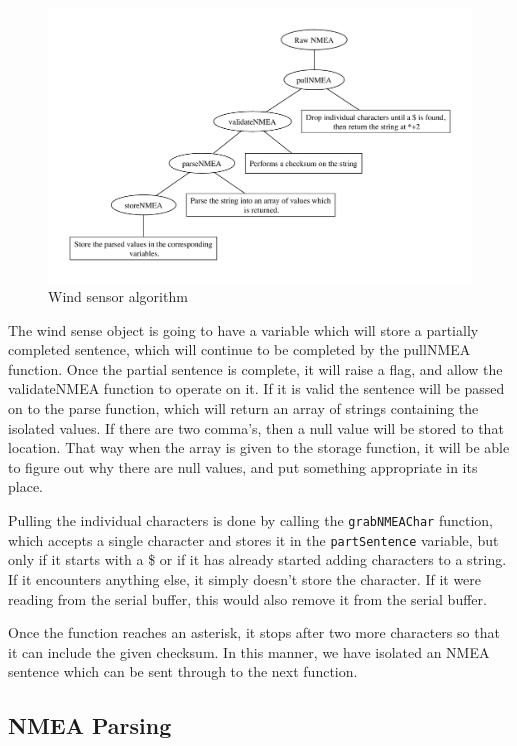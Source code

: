 \documentclass[letterpaper]{article}
\begin{document}
\begin{figure}[h]
	\centering
	\includegraphics[width=\linewidth]{maps/newparse.pdf}
	\caption{Wind sensor algorithm}
	\label{fig:newparse}
\end{figure}

The wind sense object is going to have a variable which will store a partially completed sentence, which will continue to be completed by the pullNMEA function. Once the partial sentence is complete, it will raise a flag, and allow the validateNMEA function to operate on it. If it is valid the sentence will be passed on to the parse function, which will return an array of strings containing the isolated values. If there are two comma's, then a null value will be stored to that location. That way when the array is given to the storage function, it will be able to figure out why there are null values, and put something appropriate in its place. 

Pulling the individual characters is done by calling the \verb:grabNMEAChar: function, which accepts a single character and stores it in the \verb:partSentence: variable, but only if it starts with a \$ or if it has already started adding characters to a string. If it encounters anything else, it simply doesn't store the character. If it were reading from the serial buffer, this would also remove it from the serial buffer. 

Once the function reaches an asterisk, it stops after two more characters so that it can include the given checksum. In this manner, we have isolated an NMEA sentence which can be sent through to the next function. 

\subsection{NMEA Parsing} %
\label{sub:NMEA Parsing}
\end{document}
